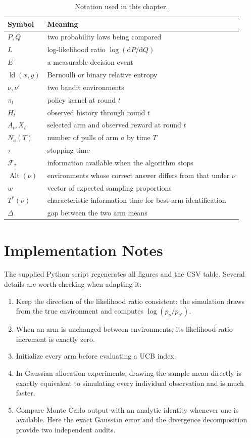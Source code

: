 \documentclass[en,nofont,11pt]{elegantbook}
\newcommand{\kl}{\operatorname{kl}}
\newcommand{\dd}{\mathrm{d}}
\newcommand{\Alt}{\operatorname{Alt}}
\newcommand{\calF}{\mathcal{F}}
\begin{document}
\begin{table}[H]
\centering
\caption{Notation used in this chapter.}
\begin{tabular}{L{0.24\textwidth}L{0.67\textwidth}}
\toprule
Symbol & Meaning \\
\midrule
$P,Q$ & two probability laws being compared \\
$L$ & log-likelihood ratio $\log(\dd P/\dd Q)$ \\
$E$ & a measurable decision event \\
$\kl(x,y)$ & Bernoulli or binary relative entropy \\
$\nu,\nu'$ & two bandit environments \\
$\pi_t$ & policy kernel at round $t$ \\
$H_t$ & observed history through round $t$ \\
$A_t,X_t$ & selected arm and observed reward at round $t$ \\
$N_a(T)$ & number of pulls of arm $a$ by time $T$ \\
$\tau$ & stopping time \\
$\calF_\tau$ & information available when the algorithm stops \\
$\Alt(\nu)$ & environments whose correct answer differs from that under $\nu$ \\
$w$ & vector of expected sampling proportions \\
$T^*(\nu)$ & characteristic information time for best-arm identification \\
$\Delta$ & gap between the two arm means \\
\bottomrule
\end{tabular}
\end{table}

\chapter*{Implementation Notes}

The supplied Python script regenerates all figures and the CSV table. Several details are worth checking when adapting it:

\begin{enumerate}
\item Keep the direction of the likelihood ratio consistent: the simulation draws from the true environment and computes $\log(p_\nu/p_{\nu'})$.
\item When an arm is unchanged between environments, its likelihood-ratio increment is exactly zero.
\item Initialize every arm before evaluating a UCB index.
\item In Gaussian allocation experiments, drawing the sample mean directly is exactly equivalent to simulating every individual observation and is much faster.
\item Compare Monte Carlo output with an analytic identity whenever one is available. Here the exact Gaussian error and the divergence decomposition provide two independent audits.
\end{enumerate}
\end{document}
